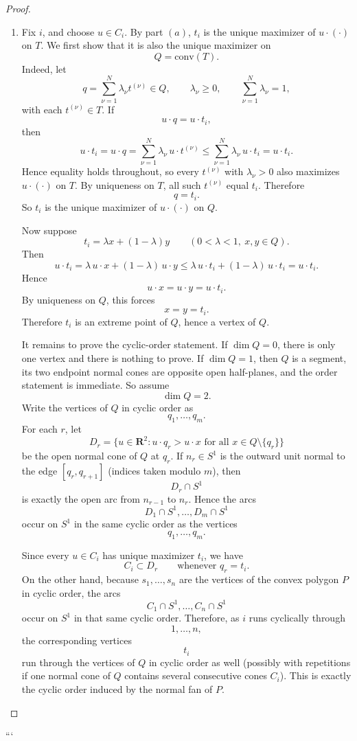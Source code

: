 \begin{proof}
\begin{enumerate}
\item[(d)] Fix $i$, and choose $u\in C_i$. By part $(a)$, $t_i$ is the unique maximizer of $u\cdot(\cdot)$ on $T$. We first show that it is also the unique maximizer on
\[
Q=\mathrm{conv}(T).
\]
Indeed, let
\[
q=\sum_{\nu=1}^N \lambda_\nu t^{(\nu)}\in Q,
\qquad
\lambda_\nu\ge 0,
\qquad
\sum_{\nu=1}^N\lambda_\nu=1,
\]
with each $t^{(\nu)}\in T$. If
\[
u\cdot q=u\cdot t_i,
\]
then
\[
u\cdot t_i
=
u\cdot q
=
\sum_{\nu=1}^N \lambda_\nu\,u\cdot t^{(\nu)}
\le
\sum_{\nu=1}^N \lambda_\nu\,u\cdot t_i
=
u\cdot t_i.
\]
Hence equality holds throughout, so every $t^{(\nu)}$ with $\lambda_\nu>0$ also maximizes $u\cdot(\cdot)$ on $T$. By uniqueness on $T$, all such $t^{(\nu)}$ equal $t_i$. Therefore
\[
q=t_i.
\]
So $t_i$ is the unique maximizer of $u\cdot(\cdot)$ on $Q$.

Now suppose
\[
t_i=\lambda x+(1-\lambda)y
\qquad
(0<\lambda<1,\ x,y\in Q).
\]
Then
\[
u\cdot t_i
=
\lambda\,u\cdot x+(1-\lambda)\,u\cdot y
\le
\lambda\,u\cdot t_i+(1-\lambda)\,u\cdot t_i
=
u\cdot t_i.
\]
Hence
\[
u\cdot x=u\cdot y=u\cdot t_i.
\]
By uniqueness on $Q$, this forces
\[
x=y=t_i.
\]
Therefore $t_i$ is an extreme point of $Q$, hence a vertex of $Q$.

It remains to prove the cyclic-order statement. If $\dim Q=0$, there is only one vertex and there is nothing to prove. If $\dim Q=1$, then $Q$ is a segment, its two endpoint normal cones are opposite open half-planes, and the order statement is immediate. So assume
\[
\dim Q=2.
\]
Write the vertices of $Q$ in cyclic order as
\[
q_1,\ldots,q_m.
\]
For each $r$, let
\[
D_r=\{u\in \mathbf{R}^2:u\cdot q_r>u\cdot x \mbox{ for all } x\in Q\setminus\{q_r\}\}
\]
be the open normal cone of $Q$ at $q_r$. If $n_r\in S^1$ is the outward unit normal to the edge $[q_r,q_{r+1}]$ (indices taken modulo $m$), then
\[
D_r\cap S^1
\]
is exactly the open arc from $n_{r-1}$ to $n_r$. Hence the arcs
\[
D_1\cap S^1,\ldots,D_m\cap S^1
\]
occur on $S^1$ in the same cyclic order as the vertices
\[
q_1,\ldots,q_m.
\]

Since every $u\in C_i$ has unique maximizer $t_i$, we have
\[
C_i\subset D_r
\qquad
\mbox{whenever } q_r=t_i.
\]
On the other hand, because $s_1,\ldots,s_n$ are the vertices of the convex polygon $P$ in cyclic order, the arcs
\[
C_1\cap S^1,\ldots,C_n\cap S^1
\]
occur on $S^1$ in that same cyclic order. Therefore, as $i$ runs cyclically through
\[
1,\ldots,n,
\]
the corresponding vertices
\[
t_i
\]
run through the vertices of $Q$ in cyclic order as well (possibly with repetitions if one normal cone of $Q$ contains several consecutive cones $C_i$). This is exactly the cyclic order induced by the normal fan of $P$.
\end{enumerate}
\end{proof}
```